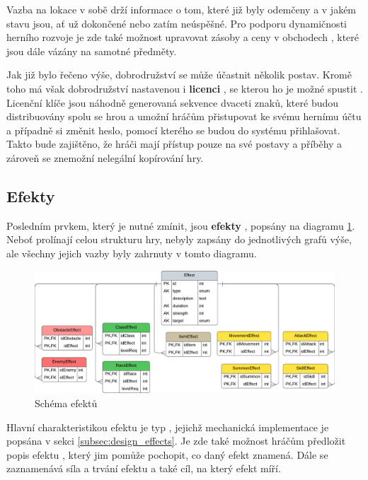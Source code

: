 Vazba na lokace  v sobě drží informace o tom, které již byly odemčeny  a v jakém stavu  jsou, ať už dokončené nebo zatím neúspěšné. Pro podporu dynamičnosti herního rozvoje je zde také možnost upravovat zásoby a ceny v obchodech , které jsou dále vázány na samotné předměty.

Jak již bylo řečeno výše, dobrodružství se může účastnit několik postav. Kromě toho má však dobrodružství nastavenou i \textbf{licenci} , se kterou ho je možné spustit . Licenční klíče jsou náhodně generovaná sekvence dvaceti znaků, které budou distribuovány spolu se hrou a umožní hráčům přistupovat ke svému hernímu účtu a případně si změnit heslo, pomocí kterého se budou do systému přihlašovat. Takto bude zajištěno, že hráči mají přístup pouze na své postavy a příběhy a zároveň se znemožní nelegální kopírování hry.


\subsection{Efekty}
\label{subsec:schema_effect}

Posledním prvkem, který je nutné zmínit, jsou \textbf{efekty} , popsány na diagramu \ref{diag:er_effect}. Neboť prolínají celou strukturu hry, nebyly zapsány do jednotlivých grafů výše, ale všechny jejich vazby byly zahrnuty v tomto diagramu. 

\begin{figure}[h]
    \centering
    \includegraphics[width=\textwidth]{../../shared/diagrams/er_effect.pdf}
    \caption{Schéma efektů}
    \label{diag:er_effect}
\end{figure}

Hlavní charakteristikou efektu je typ , jejichž mechanická implementace je popsána v sekci \ref{subsec:design_effects}. Je zde také možnost hráčům předložit popis efektu , který jim pomůže pochopit, co daný efekt znamená. Dále se zaznamenává síla a trvání efektu a také cíl, na který efekt míří.

